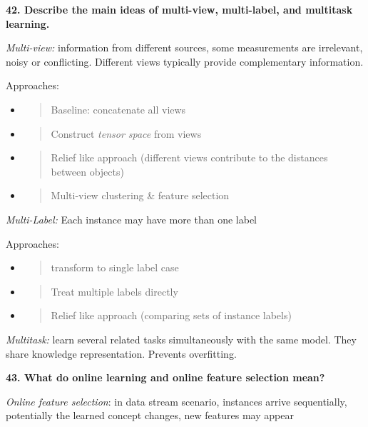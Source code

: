 \textbf{42. Describe the main ideas of multi-view, multi-label, and
multitask learning.}

\textit{Multi-view:} information from different sources, some
measurements are irrelevant, noisy or conflicting. Different views
typically provide complementary information.

Approaches:

\begin{itemize}
\item
  \begin{quote}
  Baseline: concatenate all views
  \end{quote}
\item
  \begin{quote}
  Construct \emph{tensor space} from views
  \end{quote}
\item
  \begin{quote}
  Relief like approach (different views contribute to the distances
  between objects)
  \end{quote}
\item
  \begin{quote}
  Multi-view clustering \& feature selection
  \end{quote}
\end{itemize}

\textit{Multi-Label:} Each instance may have more than one label

Approaches:

\begin{itemize}
\item
  \begin{quote}
  transform to single label case
  \end{quote}
\item
  \begin{quote}
  Treat multiple labels directly
  \end{quote}
\item
  \begin{quote}
  Relief like approach (comparing sets of instance labels)
  \end{quote}
\end{itemize}

\textit{Multitask:} learn several related tasks simultaneously with
the same model. They share knowledge representation. Prevents
overfitting.

\textbf{43. What do online learning and online feature selection mean?}

\textit{Online feature selection}: in data stream scenario, instances
arrive sequentially, potentially the learned concept changes, new
features may appear

